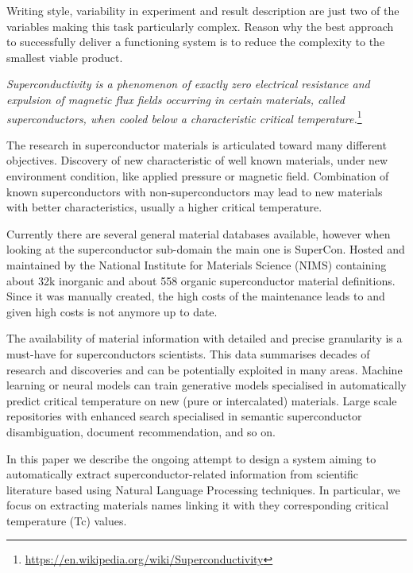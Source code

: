 \documentclass{article}
\begin{document}
Writing style, variability in experiment and result description are just two of the variables making this task particularly complex. Reason why the best approach to successfully deliver a functioning system is to reduce the complexity to the smallest viable product.

\textit{Superconductivity is a phenomenon of exactly zero electrical resistance and expulsion of magnetic flux fields occurring in certain materials, called superconductors, when cooled below a characteristic critical temperature.}\footnote{\url{https://en.wikipedia.org/wiki/Superconductivity}}

The research in superconductor materials is articulated toward many different objectives. Discovery of new characteristic of well known materials, under new environment condition, like applied pressure or magnetic field. Combination of known superconductors with non-superconductors may lead to new materials with better characteristics, usually a higher critical temperature. 

Currently there are several general material databases available, however when looking  at the superconductor sub-domain the main one is SuperCon\cite{SuperCon}. Hosted and maintained by the National Institute for Materials Science (NIMS) containing about 32k inorganic and about 558 organic superconductor material definitions. Since it was manually created, the high costs of the maintenance leads to and given high costs is not anymore up to date. 

The availability of material information with detailed and precise granularity is a must-have for superconductors scientists. This data summarises decades of research and discoveries and can be potentially exploited in many areas. Machine learning or neural models can train generative models specialised in automatically predict critical temperature \cite{DBLP:journals/corr/abs-1812-01995} on new (pure or intercalated) materials. Large scale repositories with enhanced search specialised in semantic superconductor disambiguation, document recommendation, and so on. 

In this paper we describe the ongoing attempt to design a system aiming to automatically extract superconductor-related information from scientific literature based using Natural Language Processing techniques. In particular, we focus on extracting materials names linking it with they corresponding critical temperature (Tc) values.
\end{document}
